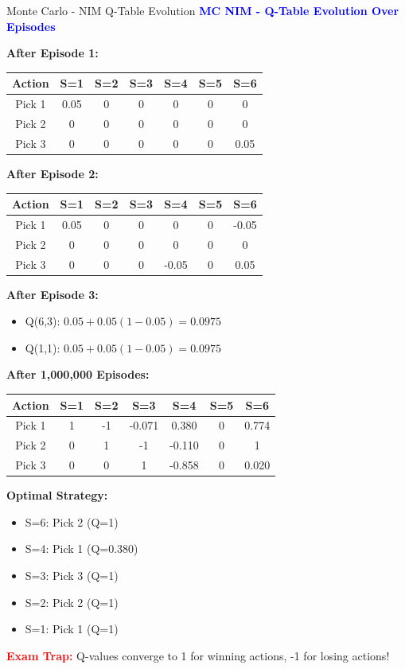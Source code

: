 \documentclass[8pt]{beamer}
\begin{document}
	\begin{frame}{Monte Carlo - NIM Q-Table Evolution}
		\fontsize{6.5}{7.5}\selectfont
		\textcolor{blue}{\textbf{MC NIM - Q-Table Evolution Over Episodes}}
		
		\textbf{After Episode 1:}
		\begin{tabular}{|c|c|c|c|c|c|c|}
			\hline
			\textbf{Action} & \textbf{S=1} & \textbf{S=2} & \textbf{S=3} & \textbf{S=4} & \textbf{S=5} & \textbf{S=6} \\
			\hline
			Pick 1 & 0.05 & 0 & 0 & 0 & 0 & 0 \\
			\hline
			Pick 2 & 0 & 0 & 0 & 0 & 0 & 0 \\
			\hline
			Pick 3 & 0 & 0 & 0 & 0 & 0 & 0.05 \\
			\hline
		\end{tabular}
		
		\textbf{After Episode 2:}
		\begin{tabular}{|c|c|c|c|c|c|c|}
			\hline
			\textbf{Action} & \textbf{S=1} & \textbf{S=2} & \textbf{S=3} & \textbf{S=4} & \textbf{S=5} & \textbf{S=6} \\
			\hline
			Pick 1 & 0.05 & 0 & 0 & 0 & 0 & -0.05 \\
			\hline
			Pick 2 & 0 & 0 & 0 & 0 & 0 & 0 \\
			\hline
			Pick 3 & 0 & 0 & 0 & -0.05 & 0 & 0.05 \\
			\hline
		\end{tabular}
		
		\textbf{After Episode 3:}
		\begin{itemize}
			\item Q(6,3): $0.05 + 0.05(1 - 0.05) = 0.0975$
			\item Q(1,1): $0.05 + 0.05(1 - 0.05) = 0.0975$
		\end{itemize}
		
		\textbf{After 1,000,000 Episodes:}
		\begin{tabular}{|c|c|c|c|c|c|c|}
			\hline
			\textbf{Action} & \textbf{S=1} & \textbf{S=2} & \textbf{S=3} & \textbf{S=4} & \textbf{S=5} & \textbf{S=6} \\
			\hline
			Pick 1 & 1 & -1 & -0.071 & 0.380 & 0 & 0.774 \\
			\hline
			Pick 2 & 0 & 1 & -1 & -0.110 & 0 & 1 \\
			\hline
			Pick 3 & 0 & 0 & 1 & -0.858 & 0 & 0.020 \\
			\hline
		\end{tabular}
		
		\textbf{Optimal Strategy:}
		\begin{itemize}
			\item S=6: Pick 2 (Q=1)
			\item S=4: Pick 1 (Q=0.380)
			\item S=3: Pick 3 (Q=1)
			\item S=2: Pick 2 (Q=1)
			\item S=1: Pick 1 (Q=1)
		\end{itemize}
		
		\textcolor{red}{\textbf{Exam Trap:}} Q-values converge to 1 for winning actions, -1 for losing actions!
	\end{frame}
	
\end{document}
